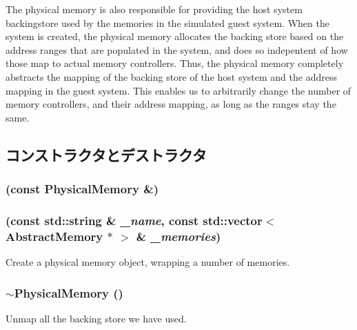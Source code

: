 The physical memory is also responsible for providing the host system backingstore used by the memories in the simulated guest system. When the system is created, the physical memory allocates the backing store based on the address ranges that are populated in the system, and does so indepentent of how those map to actual memory controllers. Thus, the physical memory completely abstracts the mapping of the backing store of the host system and the address mapping in the guest system. This enables us to arbitrarily change the number of memory controllers, and their address mapping, as long as the ranges stay the same. 

\subsection{コンストラクタとデストラクタ}
\hypertarget{classPhysicalMemory_a5247a8a9ca8b14d01253a6861b8b3bf2}{
\subsubsection[{PhysicalMemory}]{ (const {\bf PhysicalMemory} \&)}}
\label{classPhysicalMemory_a5247a8a9ca8b14d01253a6861b8b3bf2}
\hypertarget{classPhysicalMemory_a987bb2d4a9b94b62fa15261e024019e5}{
\subsubsection[{PhysicalMemory}]{ (const std::string \& {\em \_\-name}, \/  const {\bf std::vector}$<$ {\bf AbstractMemory} $\ast$ $>$ \& {\em \_\-memories})}}
\label{classPhysicalMemory_a987bb2d4a9b94b62fa15261e024019e5}
Create a physical memory object, wrapping a number of memories. \hypertarget{classPhysicalMemory_ad6a6b96cf5b3ed869b4a6f06429fd4eb}{
\subsubsection[{$\sim$PhysicalMemory}]{\setlength{\rightskip}{0pt plus 5cm}$\sim${\bf PhysicalMemory} ()}}
\label{classPhysicalMemory_ad6a6b96cf5b3ed869b4a6f06429fd4eb}
Unmap all the backing store we have used. 


